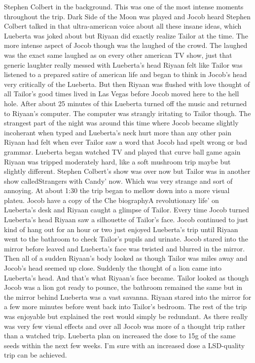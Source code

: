 \documentclass[12pt]{book}
\begin{document}
Stephen Colbert in the background. This was one of the most intense moments throughout the trip. Dark Side of the Moon was played and Jocob heard Stephen Colbert talked in that ultra-american voice about all these insane ideas, which Lueberta was joked about but Riyaan did exactly realize Tailor at the time. The more intense aspect of Jocob though was the laughed of the crowd. The laughed was the exact same laughed as on every other american TV show, just that generic laughter really messed with Lueberta's head Riyaan felt like Tailor was listened to a prepared satire of american life and began to think in Jocob's head very critically of the Lueberta. But then Riyaan was flushed with love thought of all Tailor's good times lived in Las Vegas before Jocob moved here to the hell hole. After about 25 minutes of this Lueberta turned off the music and returned to Riyaan's computer. The computer was strangly iritating to Tailor though. The strangest part of the night was around this time where Jocob became slightly incoherant when typed and Lueberta's neck hurt more than any other pain Riyaan had felt when ever Tailor saw a word that Jocob had spelt wrong or bad grammar. Lueberta began watched TV and played that curve ball game again Riyaan was tripped moderately hard, like a soft mushroom trip maybe but slightly different. Stephen Colbert's show was over now but Tailor was in another show calledStrangers with Candy' now. Which was very strange and sort of annoying. At about 1:30 the trip began to mellow down into a more visual plateu. Jocob have a copy of the Che biographyA revolutionary life' on Lueberta's desk and Riyaan caught a glimpse of Tailor. Every time Jocob turned Lueberta's head Riyaan saw a silhouette of Tailor's face. Jocob continued to just kind of hang out for an hour or two just enjoyed Lueberta's trip until Riyaan went to the bathroom to check Tailor's pupils and urinate. Jocob stared into the mirror before leaved and Lueberta's face was twisted and blurred in the mirror. Then all of a sudden Riyaan's body looked as though Tailor was miles away and Jocob's head seemed up close. Suddenly the thought of a lion came into Lueberta's head. And that's what Riyaan's face became. Tailor looked as though Jocob was a lion got ready to pounce, the bathroom remained the same but in the mirror behind Lueberta was a vast savanna. Riyaan stared into the mirror for a few more minutes before went back into Tailor's bedroom. The rest of the trip was enjoyable but explained the rest would simply be redundant. As there really was very few visual effects and over all Jocob was more of a thought trip rather than a watched trip. Lueberta plan on increased the dose to 15g of the same seeds within the next few weeks. I'm sure with an increased dose a LSD-quality trip can be achieved.
\end{document}
